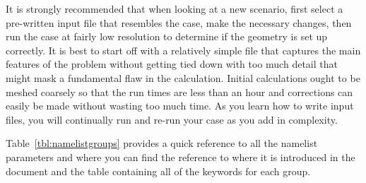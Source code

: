 \documentclass[11pt]{book}
\begin{document}
\noindent
It is strongly recommended that when looking at a new scenario,
first select a pre-written input file that resembles the case,
make the necessary changes, then run the case at fairly low
resolution to determine if the geometry is set up correctly.
It is best to start off with a relatively simple file that captures the main
features of the problem without getting tied down with too much detail that
might mask a fundamental flaw in the calculation. Initial calculations ought
to be meshed coarsely so that the run times are less than an hour and
corrections can easily be made without wasting too much time.
As you learn how to write input files, you will continually
run and re-run your case as you add in complexity.

Table~\ref{tbl:namelistgroups} provides a quick reference to all the namelist parameters and
where you can find the reference to where it is introduced in the document and the
table containing all of the keywords for each group.
\end{document}
